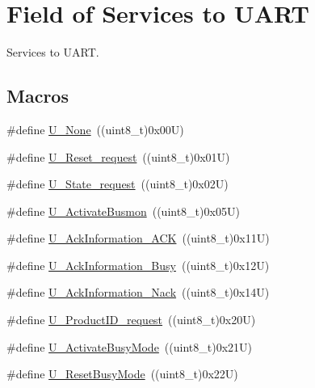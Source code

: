 \hypertarget{group___u_a_r_t___control___to}{}\section{Field of Services to U\+A\+RT}
\label{group___u_a_r_t___control___to}


Services to U\+A\+RT.  


\subsection*{Macros}
\begin{DoxyCompactItemize}
\item 
\#define \hyperlink{group___u_a_r_t___control___to_ga30eddf5dc99c172d71df52a3a9c466bc}{U\+\_\+\+None}~((uint8\+\_\+t)0x00\+U)
\item 
\#define \hyperlink{group___u_a_r_t___control___to_gab4e4e9acfc0b14566dee580c784d43c5}{U\+\_\+\+Reset\+\_\+request}~((uint8\+\_\+t)0x01\+U)
\item 
\#define \hyperlink{group___u_a_r_t___control___to_ga8dda3117e8869a900e5c5fe6f1b3a768}{U\+\_\+\+State\+\_\+request}~((uint8\+\_\+t)0x02\+U)
\item 
\#define \hyperlink{group___u_a_r_t___control___to_ga08302041c8622699abb02954c7942d33}{U\+\_\+\+Activate\+Busmon}~((uint8\+\_\+t)0x05\+U)
\item 
\#define \hyperlink{group___u_a_r_t___control___to_gae8d1e40bf2415207f384e3fdd134c844}{U\+\_\+\+Ack\+Information\+\_\+\+A\+CK}~((uint8\+\_\+t)0x11\+U)
\item 
\#define \hyperlink{group___u_a_r_t___control___to_gacd4e123da098779b9de44bbc97c85f18}{U\+\_\+\+Ack\+Information\+\_\+\+Busy}~((uint8\+\_\+t)0x12\+U)
\item 
\#define \hyperlink{group___u_a_r_t___control___to_gad838fe8a0601483afcb0e90edd03c277}{U\+\_\+\+Ack\+Information\+\_\+\+Nack}~((uint8\+\_\+t)0x14\+U)
\item 
\#define \hyperlink{group___u_a_r_t___control___to_ga0fd706c07225b8d94a9e61178e9f1de2}{U\+\_\+\+Product\+I\+D\+\_\+request}~((uint8\+\_\+t)0x20\+U)
\item 
\#define \hyperlink{group___u_a_r_t___control___to_ga570dbcb6f3b58812795897e653cf6bcd}{U\+\_\+\+Activate\+Busy\+Mode}~((uint8\+\_\+t)0x21\+U)
\item 
\#define \hyperlink{group___u_a_r_t___control___to_gadddb4434f9a2e47ed320bc3bd39eec0c}{U\+\_\+\+Reset\+Busy\+Mode}~((uint8\+\_\+t)0x22\+U)

\end{DoxyCompactItemize}
